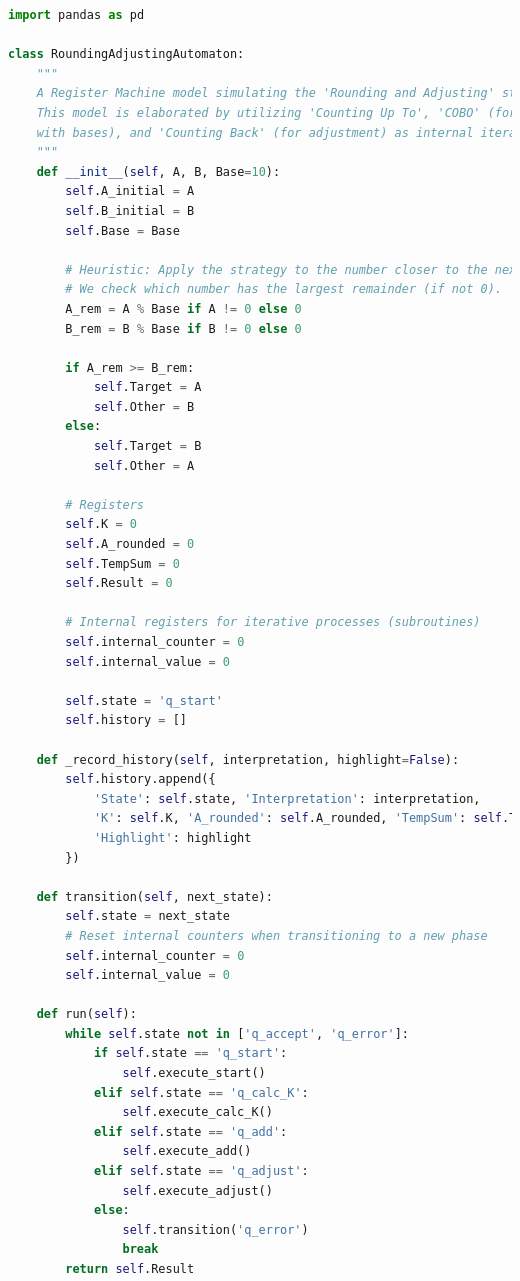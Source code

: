 \documentclass[11pt]{article}
\begin{document}
\begin{lstlisting}[language=Python]
import pandas as pd

class RoundingAdjustingAutomaton:
    """
    A Register Machine model simulating the 'Rounding and Adjusting' strategy.
    This model is elaborated by utilizing 'Counting Up To', 'COBO' (for addition
    with bases), and 'Counting Back' (for adjustment) as internal iterative processes.
    """
    def __init__(self, A, B, Base=10):
        self.A_initial = A
        self.B_initial = B
        self.Base = Base

        # Heuristic: Apply the strategy to the number closer to the next base.
        # We check which number has the largest remainder (if not 0).
        A_rem = A % Base if A != 0 else 0
        B_rem = B % Base if B != 0 else 0

        if A_rem >= B_rem:
            self.Target = A
            self.Other = B
        else:
            self.Target = B
            self.Other = A

        # Registers
        self.K = 0
        self.A_rounded = 0
        self.TempSum = 0
        self.Result = 0

        # Internal registers for iterative processes (subroutines)
        self.internal_counter = 0
        self.internal_value = 0

        self.state = 'q_start'
        self.history = []

    def _record_history(self, interpretation, highlight=False):
        self.history.append({
            'State': self.state, 'Interpretation': interpretation,
            'K': self.K, 'A_rounded': self.A_rounded, 'TempSum': self.TempSum, 'Result': self.Result,
            'Highlight': highlight
        })

    def transition(self, next_state):
        self.state = next_state
        # Reset internal counters when transitioning to a new phase
        self.internal_counter = 0
        self.internal_value = 0

    def run(self):
        while self.state not in ['q_accept', 'q_error']:
            if self.state == 'q_start':
                self.execute_start()
            elif self.state == 'q_calc_K':
                self.execute_calc_K()
            elif self.state == 'q_add':
                self.execute_add()
            elif self.state == 'q_adjust':
                self.execute_adjust()
            else:
                self.transition('q_error')
                break
        return self.Result


\end{lstlisting}
\end{document}
